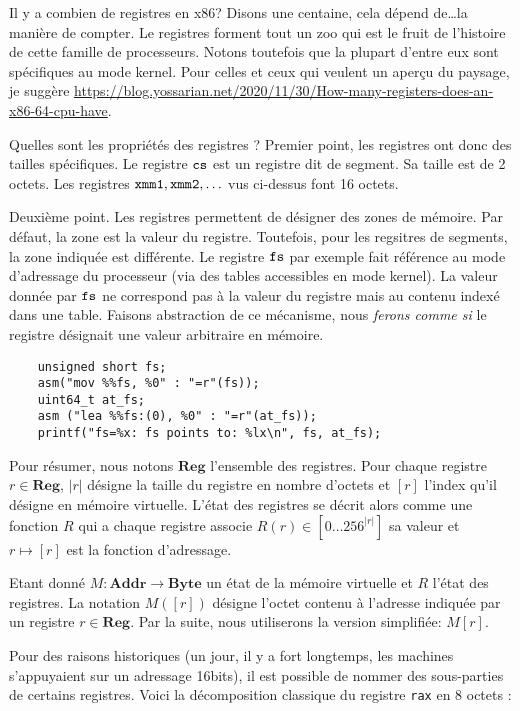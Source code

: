 \documentclass{book}
\newcommand{\rax}{{\tt rax}\xspace}
\newcommand{\rcs}{{\tt cs}\xspace}
\newcommand{\rfs}{{\tt fs}\xspace}
\newcommand{\Byte}{{\mathbf{Byte}}}
\newcommand{\Addr}{{\mathbf{Addr}}}
\newcommand{\Reg}{{\mathbf{Reg}}}
\begin{document}
{Il y a combien de registres en {\sc x86}? Disons une centaine, cela dépend de\ldots la manière de compter. Le registres forment tout un zoo qui est le fruit de l'histoire de cette famille de processeurs. Notons toutefois que la plupart d'entre eux sont spécifiques au mode kernel. Pour celles et ceux qui veulent un aperçu du paysage, je suggère \url{https://blog.yossarian.net/2020/11/30/How-many-registers-does-an-x86-64-cpu-have}.

Quelles sont les propriétés des registres ? Premier point, les registres ont donc des tailles spécifiques. Le registre $\rcs$ est un registre dit de segment. Sa taille est de 2 octets. Les registres ${\tt xmm1}, {\tt xmm2}, \ldots$ vus ci-dessus font 16 octets.

Deuxième point. Les registres permettent de désigner des zones de mémoire. Par défaut, la zone est la valeur du registre. Toutefois, pour les regsitres de segments, la zone indiquée est différente. Le registre $\rfs$ par exemple fait référence au mode d'adressage du processeur (via des tables accessibles en mode kernel). La valeur donnée par $\rfs$ ne correspond pas à la valeur du registre mais au contenu indexé dans une table. Faisons abstraction de ce mécanisme, nous \emph{ferons comme si} le registre désignait une valeur arbitraire en mémoire.

\begin{verbatim}
	unsigned short fs;
	asm("mov %%fs, %0" : "=r"(fs));
	uint64_t at_fs;
	asm ("lea %%fs:(0), %0" : "=r"(at_fs));
	printf("fs=%x: fs points to: %lx\n", fs, at_fs);
\end{verbatim}

Pour résumer, nous notons $\Reg$ l'ensemble des registres. Pour chaque registre $r\in \Reg$, $|r|$ désigne la taille du registre en nombre d'octets et $[r]$ l'index qu'il désigne en mémoire virtuelle. L'état des registres se décrit alors comme une fonction $R$ qui a chaque registre associe $R(r) \in [0\ldots 256^{|r|}]$ sa valeur et $r \mapsto [r]$ est la fonction d'adressage.  

Etant donné $M:  \Addr \to \Byte$ un état de la mémoire virtuelle et $R$ l'état des registres. La notation $M([r])$ désigne l'octet contenu à l'adresse indiquée par un registre $r \in \Reg$. Par la suite, nous utiliserons la version simplifiée: $M[r]$. 

Pour des raisons historiques (un jour, il y a fort longtemps, les machines s'appuyaient sur un adressage 16bits), il est possible de nommer des sous-parties de certains registres. Voici la décomposition classique du registre \rax en 8 octets :

}
\end{document}
